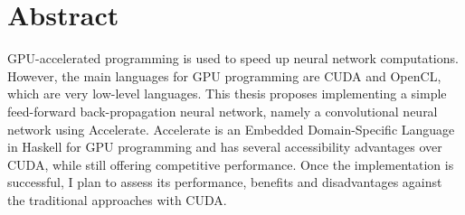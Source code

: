 \chapter*{Abstract}\label{abstract}

GPU-accelerated programming is used to speed up neural network computations. However, the main languages for GPU programming are CUDA and OpenCL, which are very low-level languages. This thesis proposes implementing a simple feed-forward back-propagation neural network, namely a convolutional neural network using Accelerate. Accelerate is an Embedded Domain-Specific Language in Haskell for GPU programming and has several accessibility advantages over CUDA, while still offering competitive performance. Once the implementation is successful, I plan to assess its performance, benefits and disadvantages against the traditional approaches with CUDA.